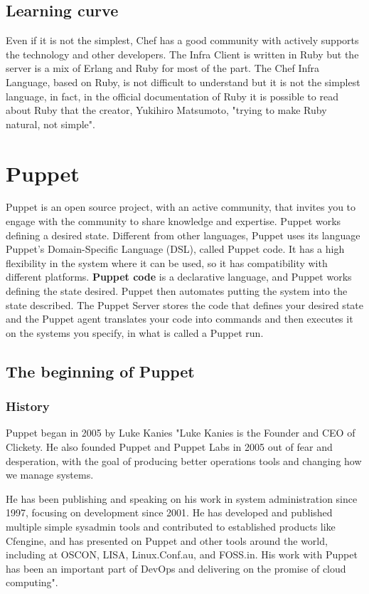 \documentclass[12pt,a4paper,openright,twoside]{book}
\begin{document}
\section{Learning curve}
Even if it is not the simplest, Chef has a good community with actively supports the technology and other developers.
The Infra Client is written in Ruby but the server is a mix of Erlang and Ruby for most of the part.
The Chef Infra Language, based on Ruby, is not difficult to understand but it is not the simplest language, in fact, in the official documentation of Ruby it is possible to read about Ruby that the creator, Yukihiro Matsumoto, "trying to make Ruby natural, not simple"\cite{rubyDoc}.

\chapter{Puppet}
Puppet is an open source project, with an active community, that invites you to engage with the community to share knowledge and expertise.
Puppet works defining a desired state. Different from other languages, Puppet uses its language Puppet's Domain-Specific Language (DSL), called Puppet code.
It has a high flexibility in the system where it can be used, so it has compatibility with different platforms.
\textbf{Puppet code} is a declarative language, and Puppet works defining the state desired. Puppet then automates putting the system into the state described.
The Puppet Server stores the code that defines your desired state and the Puppet agent translates your code into commands and then executes it on the systems you specify, in what is called a Puppet run.
\cite{puppetDocIndex}
\cite{puppetDocWhatIs}

\section{The beginning of Puppet}

\subsection{History}
Puppet began in 2005 by Luke Kanies
"Luke Kanies is the Founder and CEO of Clickety. He also founded Puppet and Puppet Labs in 2005 out of fear and desperation, with the goal of producing better operations tools and changing how we manage systems.


He has been publishing and speaking on his work in system administration since 1997, focusing on development since 2001. He has developed and published multiple simple sysadmin tools and contributed to established products like Cfengine, and has presented on Puppet and other tools around the world, including at OSCON, LISA, Linux.Conf.au, and FOSS.in. His work with Puppet has been an important part of DevOps and delivering on the promise of cloud computing".\cite{puppetStory1}
\end{document}
